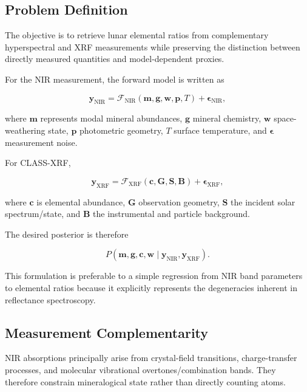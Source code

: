 \documentclass[11pt,a4paper]{article}
\begin{document}
\subsection{Problem Definition}

The objective is to retrieve lunar elemental ratios from complementary hyperspectral and XRF measurements while preserving the distinction between directly measured quantities and model-dependent proxies.

For the NIR measurement, the forward model is written as

\begin{equation}
\mathbf{y}_{\mathrm{NIR}}
=
\mathcal{F}_{\mathrm{NIR}}
\left(
\mathbf{m},
\mathbf{g},
\mathbf{w},
\mathbf{p},
T
\right)
+
\boldsymbol{\epsilon}_{\mathrm{NIR}},
\end{equation}

where $\mathbf{m}$ represents modal mineral abundances, $\mathbf{g}$ mineral chemistry, $\mathbf{w}$ space-weathering state, $\mathbf{p}$ photometric geometry, $T$ surface temperature, and $\boldsymbol{\epsilon}$ measurement noise.

For CLASS-XRF,

\begin{equation}
\mathbf{y}_{\mathrm{XRF}}
=
\mathcal{F}_{\mathrm{XRF}}
\left(
\mathbf{c},
\mathbf{G},
\mathbf{S},
\mathbf{B}
\right)
+
\boldsymbol{\epsilon}_{\mathrm{XRF}},
\end{equation}

where $\mathbf{c}$ is elemental abundance, $\mathbf{G}$ observation geometry, $\mathbf{S}$ the incident solar spectrum/state, and $\mathbf{B}$ the instrumental and particle background.

The desired posterior is therefore

\begin{equation}
P
\left(
\mathbf{m},
\mathbf{g},
\mathbf{c},
\mathbf{w}
\mid
\mathbf{y}_{\mathrm{NIR}},
\mathbf{y}_{\mathrm{XRF}}
\right).
\end{equation}

This formulation is preferable to a simple regression from NIR band parameters to elemental ratios because it explicitly represents the degeneracies inherent in reflectance spectroscopy.

\subsection{Measurement Complementarity}

NIR absorptions principally arise from crystal-field transitions, charge-transfer processes, and molecular vibrational overtones/combination bands. They therefore constrain mineralogical state rather than directly counting atoms.
\end{document}

